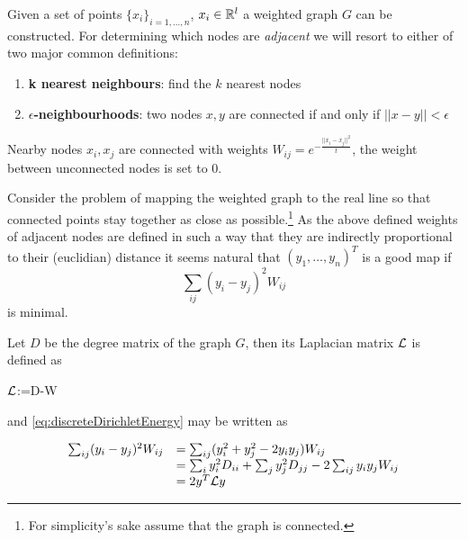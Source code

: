Given a set of points $\{x_i\}_{i=1,\dots,n}$, $x_i \in \mathbb{R}^l$ a weighted graph $G$ can be constructed. For determining which nodes are \textit{adjacent} we will resort to either of two major common definitions:
\begin{enumerate}
    \item \textbf{k nearest neighbours}: find the $k$ nearest nodes
    \item \textbf{$\epsilon$-neighbourhoods}: two nodes $x,y$ are connected if and only if $||x-y||<\epsilon$
\end{enumerate}

Nearby nodes $x_i,x_j$ are connected with weights $W_{ij}=e^{-\frac{||x_i - x_j||^2}{t}}$, the weight between unconnected nodes is set to $0$.

Consider the problem of mapping the weighted graph to the real line so that connected points stay together as close as possible.\footnote{For simplicity's sake assume that the graph is connected.}
As the above defined weights of adjacent nodes are defined in such a way that they are indirectly proportional to their (euclidian) distance it seems natural that $(y_1,\dots,y_n)^T$ is a good map if
\begin{equation} \label{eq:discreteDirichletEnergy}
    \sum_{ij} (y_i - y_j)^2 W_{ij}
\end{equation}
is minimal.

Let $D$ be the degree matrix of the graph $G$, then its Laplacian matrix $\mathcal{L}$ is defined as
\begin{definition}
    $\mathcal{L}$:=D-W
\end{definition}

and \eqref{eq:discreteDirichletEnergy} may be written as 

\begin{equation*}\begin{array}{l l}
\sum_{ij} (y_i - y_j)^2 W_{ij} &= \sum_{ij} (y_i^2 + y_j^2 - 2y_i y_j) W_{ij}\\
    &= \sum_{i} y_i^2 D_{ii} + \sum_{j} y_j^2 D_{jj} - 2\sum_{ij} y_i y_j W_{ij}\\
    &= 2y^T\mathcal{L} y
\end{array}\end{equation*}

